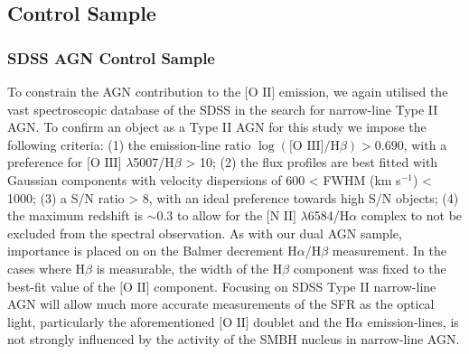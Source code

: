 \subsection{Control Sample}

\subsubsection{SDSS AGN Control Sample}

To constrain the AGN contribution to the $\text{[O II]}$ emission, we again utilised the vast spectroscopic database of the SDSS in the search for narrow-line Type II AGN. To confirm an object as a Type II AGN for this study we impose the following criteria: (1) the emission-line ratio $\log(\text{[O III]}/\text{H}\beta)>{0.690}$, with a preference for $\text{[O III]}$ $\lambda$5007/$\text{H}\beta$ > 10; (2) the flux profiles are best fitted with Gaussian components with velocity dispersions of 600 < FWHM (km s$^{-1}$) < 1000; (3) a S/N ratio > 8, with an ideal preference towards high S/N objects; (4) the maximum redshift is $\sim{0.3}$ to allow for the $\text{[N II]}$ $\lambda$6584/$\text{H}\alpha$ complex to not be excluded from the spectral observation. As with our dual AGN sample, importance is placed on on the Balmer decrement $\text{H}\alpha$/$\text{H}\beta$ measurement. In the cases where $\text{H}\beta$ is measurable, the width of the $\text{H}\beta$ component was fixed to the best-fit value of the $\text{[O II]}$ component. Focusing on SDSS Type II narrow-line AGN will allow much more accurate measurements of the SFR as the optical light, particularly the aforementioned $\text{[O II]}$ doublet and the $\text{H}\alpha$ emission-lines, is not strongly influenced by the activity of the SMBH nucleus in narrow-line AGN.
  
  
  